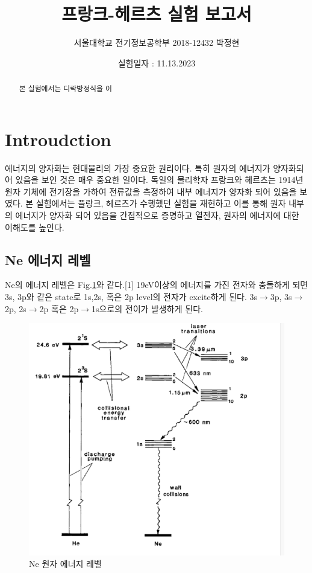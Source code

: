 \documentclass[%
 reprint,
 amsmath,amssymb,
 aps,
]{revtex4-2}
\begin{document}
\title{프랑크-헤르츠 실험 보고서}

\author{서울대학교 전기정보공학부 2018-12432 박정현}
\date{실험일자 : 11.13.2023}%

\begin{abstract}
본 실험에서는 디락방정식을 이
\end{abstract}

\maketitle


\section{Introudction}
에너지의 양자화는 현대물리의 가장 중요한 원리이다. 특히 원자의 에너지가 양자화되어 있음을 보인 것은 매우 중요한 일이다. 독일의 물리학자 프랑크와 헤르츠는 1914년 원자 기체에 전기장을 가하여 전류값을 측정하여 내부 에너지가 양자화 되어 있음을 보였다. 본 실험에서는 플랑크, 헤르츠가 수행했던 실험을 재현하고 이를 통해 원자 내부의 에너지가 양자화 되어 있음을 간접적으로 증명하고 열전자, 원자의 에너지에 대한 이해도를 높인다.

\subsection{Ne 에너지 레벨}
Ne의 에너지 레벨은 Fig.\ref{fig:Neenergy}와 같다.[1] 19eV이상의 에너지를 가진 전자와 충돌하게 되면 3s, 3p와 같은 state로 1s,2s, 혹은 2p level의 전자가 excite하게 된다. 3s$\rightarrow$3p, 3s$\rightarrow$2p, 2s$\rightarrow$2p 혹은 2p$\rightarrow$1s으로의 전이가 발생하게 된다.

\begin{figure}[htbp]
	\includegraphics[width = 0.85\linewidth]{Neenergy.png}%
	\caption{\label{fig:Neenergy}Ne 원자 에너지 레벨}
\end{figure}
\end{document}
